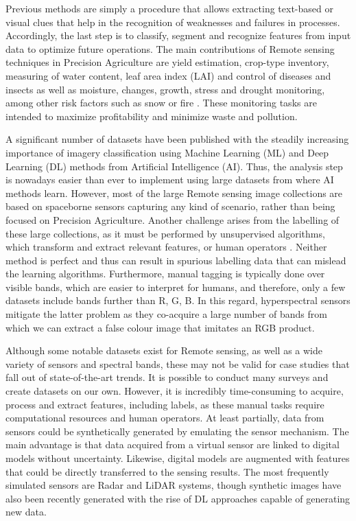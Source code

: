 Previous methods are simply a procedure that allows extracting text-based or visual clues that help in the recognition of weaknesses and failures in processes. Accordingly, the last step is to classify, segment and recognize features from input data to optimize future operations. The main contributions of \gls{Remote sensing} techniques in Precision Agriculture are  yield estimation, crop-type inventory, measuring of water content, leaf area index (LAI) and control of diseases and insects as well as moisture, changes, growth, stress and drought monitoring, among other risk factors such as snow or fire \cite{huang_agricultural_2018}. These monitoring tasks are intended to maximize profitability and minimize waste and pollution. 

A significant number of datasets have been published with the steadily increasing importance of imagery classification using Machine Learning (ML) and Deep Learning (DL) methods from Artificial Intelligence (AI). Thus, the analysis step is nowadays easier than ever to implement using large datasets from where AI methods learn. However, most of the large \gls{Remote sensing} image collections are based on spaceborne sensors capturing any kind of scenario, rather than being focused on Precision Agriculture. Another challenge arises from the labelling of these large collections, as it must be performed by unsupervised algorithms, which transform and extract relevant features, or human operators \cite{li_image_2021, basu_deepsat_2015}. Neither method is perfect and thus can result in spurious labelling data that can mislead the learning algorithms. Furthermore, manual tagging is typically done over visible bands, which are easier to interpret for humans, and therefore, only a few datasets include bands further than R, G, B. In this regard, hyperspectral sensors mitigate the latter problem as they co-acquire a large number of bands from which we can extract a false colour image that imitates an RGB product.

Although some notable datasets exist for \gls{Remote sensing}, as well as a wide variety of sensors and spectral bands, these may not be valid for case studies that fall out of state-of-the-art trends. It is possible to conduct many surveys and create datasets on our own. However, it is incredibly time-consuming to acquire, process and extract features, including labels, as these manual tasks require computational resources and human operators. At least partially, data from sensors could be synthetically generated by emulating the sensor mechanism. The main advantage is that data acquired from a virtual sensor are linked to digital models without uncertainty. Likewise, digital models are augmented with features that could be directly transferred to the sensing results. The most frequently simulated sensors are Radar and LiDAR systems, though synthetic images have also been recently generated with the rise of DL approaches capable of generating new data.  

